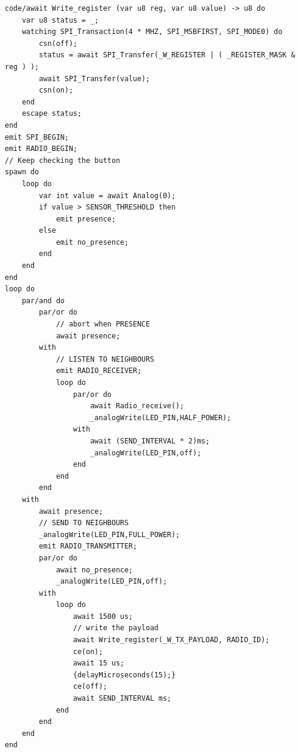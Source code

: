 \documentclass[11pt]{article}
\begin{document}
\begin{lstlisting}[style=CStyle,label=spi-ceu-abstraction-final,caption=Aplicação utilizando driver SPI em Céu com operações encapsuladas]
code/await Write_register (var u8 reg, var u8 value) -> u8 do
    var u8 status = _;
    watching SPI_Transaction(4 * MHZ, SPI_MSBFIRST, SPI_MODE0) do
        csn(off);
        status = await SPI_Transfer(_W_REGISTER | ( _REGISTER_MASK & reg ) ); 
        await SPI_Transfer(value);
        csn(on);
    end
    escape status;
end
emit SPI_BEGIN;
emit RADIO_BEGIN;
// Keep checking the button
spawn do
    loop do
        var int value = await Analog(0);
        if value > SENSOR_THRESHOLD then
            emit presence;
        else
            emit no_presence;
        end
    end
end
loop do
    par/and do
        par/or do
            // abort when PRESENCE
            await presence;
        with
            // LISTEN TO NEIGHBOURS
            emit RADIO_RECEIVER;
            loop do
                par/or do
                    await Radio_receive();
                    _analogWrite(LED_PIN,HALF_POWER);
                with
                    await (SEND_INTERVAL * 2)ms;
                    _analogWrite(LED_PIN,off);
                end
            end 
        end 
    with
        await presence;
        // SEND TO NEIGHBOURS
        _analogWrite(LED_PIN,FULL_POWER);
        emit RADIO_TRANSMITTER;
        par/or do
            await no_presence;
            _analogWrite(LED_PIN,off);
        with
            loop do
                await 1500 us;
                // write the payload
                await Write_register(_W_TX_PAYLOAD, RADIO_ID);
                ce(on);
                await 15 us;
                {delayMicroseconds(15);}
                ce(off);
                await SEND_INTERVAL ms;
            end
        end
    end
end
\end{lstlisting}
\end{document}

